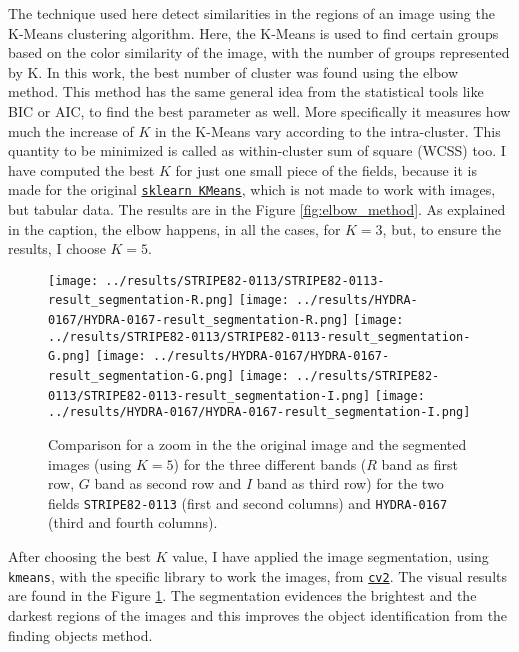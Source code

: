 \documentclass{article}
\begin{document}
The technique used here detect similarities in the regions of an image using the K-Means clustering algorithm. Here, the K-Means is used to find certain groups based on the color similarity of the image, with the number of groups represented by K. In this work, the best number of cluster was found using the elbow method. This method has the same general idea from the statistical tools like BIC or AIC, to find the best parameter as well. More specifically it measures how much the increase of $K$ in the K-Means vary according to the intra-cluster. This quantity to be minimized is called as within-cluster sum of square (WCSS) too. I have computed the best $K$ for just one small piece of the fields, because it is made for the original \href{https://scikit-learn.org/stable/modules/generated/sklearn.cluster.KMeans.html}{\texttt{sklearn KMeans}}, which is not made to work with images, but tabular data. The results are in the Figure \ref{fig:elbow_method}. As explained in the caption, the elbow happens, in all the cases, for $K = 3$, but, to ensure the results, I choose $K = 5$.

\begin{figure}[h!]
  \centering
  \texttt{[image: ../results/STRIPE82-0113/STRIPE82-0113-result\_segmentation-R.png]}
  \texttt{[image: ../results/HYDRA-0167/HYDRA-0167-result\_segmentation-R.png]}
  \texttt{[image: ../results/STRIPE82-0113/STRIPE82-0113-result\_segmentation-G.png]}
  \texttt{[image: ../results/HYDRA-0167/HYDRA-0167-result\_segmentation-G.png]}
  \texttt{[image: ../results/STRIPE82-0113/STRIPE82-0113-result\_segmentation-I.png]}
  \texttt{[image: ../results/HYDRA-0167/HYDRA-0167-result\_segmentation-I.png]}
  \caption{Comparison for a zoom in the the original image and the segmented images (using $K = 5$) for the three different bands ($R$ band as first row, $G$ band as second row and $I$ band as third row) for the two fields \texttt{STRIPE82-0113} (first and second columns) and \texttt{HYDRA-0167} (third and fourth columns).}
  \label{fig:comparison_segmentation}
\end{figure}

After choosing the best $K$ value, I have applied the image segmentation, using \texttt{kmeans}, with the specific library to work the images, from \href{https://docs.opencv.org/4.5.2/d1/d5c/tutorial_py_kmeans_opencv.html}{\texttt{cv2}}. The visual results are found in the Figure \ref{fig:comparison_segmentation}. The segmentation evidences the brightest and the darkest regions of the images and this improves the object identification from the finding objects method.
\end{document}
